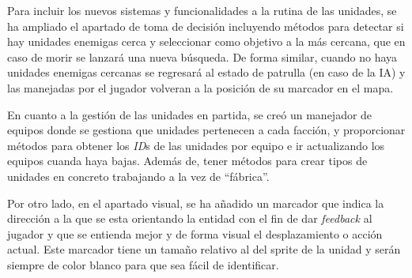 Para incluir los nuevos sistemas y funcionalidades a la rutina de las unidades, se ha ampliado
el apartado de toma de decisión incluyendo métodos para detectar si hay unidades enemigas 
cerca y seleccionar como objetivo a la más cercana, que en caso de morir se lanzará una nueva
búsqueda. De forma similar, cuando no haya unidades enemigas cercanas se regresará al estado de
patrulla (en caso de la IA) y las manejadas por el jugador volveran a la posición de su
marcador en el mapa. 

En cuanto a la gestión de las unidades en partida, se creó un manejador de equipos donde se gestiona que
unidades pertenecen a cada facción, y proporcionar métodos para obtener los \textit{ID}s de las
unidades por equipo e ir actualizando los equipos cuanda haya bajas. Además de, tener métodos
para crear tipos de unidades en concreto trabajando a la vez de ``fábrica''.

Por otro lado, en el apartado visual, se ha añadido un marcador que indica la dirección a la
que se esta orientando la entidad con el fin de dar \textit{feedback} al jugador y que se 
entienda mejor y de forma visual el desplazamiento o acción actual. Este marcador tiene un 
tamaño relativo al del sprite de la unidad y serán siempre de color blanco para que sea
fácil de identificar. 

